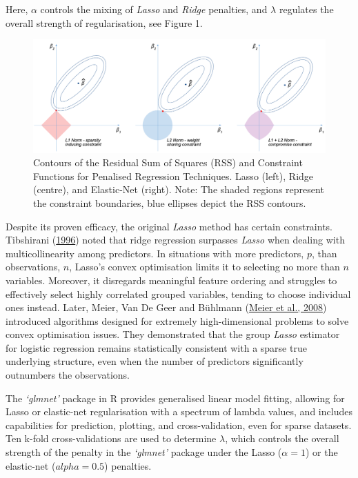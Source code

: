 \documentclass[
  11pt,
]{article}
\begin{document}
Here, \(\alpha\) controls the mixing of \emph{Lasso} and \emph{Ridge}
penalties, and \(\lambda\) regulates the overall strength of
regularisation, see Figure 1.

\begin{figure}

{\centering \includegraphics[width=1\linewidth]{reg_pen} 

}

\caption{Contours of the Residual Sum of Squares (RSS) and Constraint Functions for Penalised Regression Techniques. Lasso (left), Ridge (centre), and Elastic-Net (right). Note: The shaded regions represent the constraint boundaries, blue ellipses depict the RSS contours.}\label{fig:penalisation graphics}
\end{figure}

Despite its proven efficacy, the original \emph{Lasso} method has
certain constraints. Tibshirani
(\protect\hyperlink{ref-Tibshirani1996}{1996}) noted that ridge
regression surpasses \emph{Lasso} when dealing with multicollinearity
among predictors. In situations with more predictors, \(p\), than
observations, \(n\), Lasso's convex optimisation limits it to selecting
no more than \(n\) variables. Moreover, it disregards meaningful feature
ordering and struggles to effectively select highly correlated grouped
variables, tending to choose individual ones instead. Later, Meier, Van
De Geer and Bühlmann (\protect\hyperlink{ref-Meier2008}{Meier et al.,
2008}) introduced algorithms designed for extremely high-dimensional
problems to solve convex optimisation issues. They demonstrated that the
group \emph{Lasso} estimator for logistic regression remains
statistically consistent with a sparse true underlying structure, even
when the number of predictors significantly outnumbers the observations.

The \emph{`glmnet'} package in R provides generalised linear model
fitting, allowing for Lasso or elastic-net regularisation with a
spectrum of lambda values, and includes capabilities for prediction,
plotting, and cross-validation, even for sparse datasets. Ten k-fold
cross-validations are used to determine \(\lambda\), which controls the
overall strength of the penalty in the \emph{`glmnet'} package under the
Lasso (\(\alpha = 1\)) or the elastic-net (\(alpha = 0.5\)) penalties.
\end{document}
